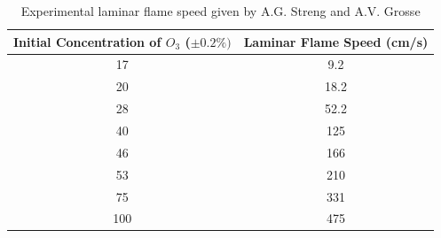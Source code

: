 \begin{table}[h]
\caption {Experimental laminar flame speed given by A.G. Streng and
  A.V. Grosse\cite{Streng}} \label{tab:ozone-flame-data}
\begin{center}

\begin{tabular}{|c|c|}
\hline \textbf{ Initial Concentration of $O_3$ ($\pm 0.2 \% )$} &
\textbf{ Laminar Flame Speed (cm/s)} \\ \hline 17& 9.2 \\ \hline 20&
18.2 \\ \hline 28& 52.2 \\ \hline 40& 125 \\ \hline 46& 166 \\ \hline
53& 210 \\ \hline 75& 331 \\ \hline 100& 475 \\ \hline
\end{tabular}
\end{center}
\end{table}
